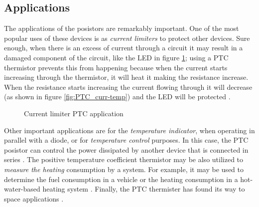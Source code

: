 \FloatBarrier \subsection{Applications}
The applications of the posistors are remarkably important. One of the most popular uses of these devices is as \textit{current limiters} to protect other devices. Sure enough, when there is an excess of current through a circuit it may result in a damaged component of the circuit, like the LED in figure \ref{fig:PTC-circuit-LED}; using a PTC thermistor prevents this from happening because when the current starts increasing through the thermistor, it will heat it making the resistance increase. When the resistance starts increasing the current flowing through it will decrease (as shown in figure \ref{fig:PTC_curr-temp}) and the LED will be protected \cite{Saburi196353}\cite{Perkins1982225}.

\begin{figure}
    \centering
    
    \label{fig:PTC-circuit-LED}
    \caption{Current limiter PTC application}
\end{figure}

Other important applications are for the \textit{temperature indicator}, when operating in parallel with a diode, or for \textit{temperature control} purposes. In this case, the PTC posistor can control the power dissipated by another device that is connected in series \cite{Saburi196353}\cite{Perkins1982225}. The positive temperature coefficient thermistor may be also utilized to \textit{measure the heating} consumption by a system. For example, it may be used to determine the fuel consumption in a vehicle or the heating consumption in a hot-water-based heating system \cite{Dostert1982159}. Finally, the PTC thermister has found its way to space applications \cite{Ishikawa1989116}.

